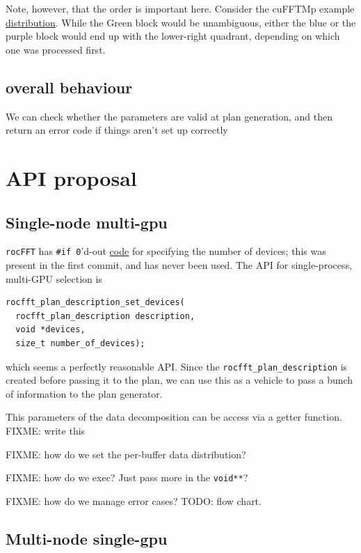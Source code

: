 \documentclass[12pt]{article}
\renewcommand{\(}{\left(}
\renewcommand{\)}{\right)}
\begin{document}
Note, however, that the order is important here.  Consider the cuFFTMp
example
\href{https://docs.nvidia.com/hpc-sdk/cufftmp/usage/api_usage.html#usage-with-custom-slabs-and-pencils-data-decompositions}{distribution}.
While the Green block would be unambiguous, either the blue or the
purple block would end up with the lower-right quadrant, depending on
which one was processed first.

\subsection{overall behaviour}

We can check whether the parameters are valid at plan generation, and
then return an error code if things aren't set up correctly

\section{API proposal}

\subsection{Single-node multi-gpu}

\texttt{rocFFT} has \lstinline{#if 0}'d-out
\href{https://github.com/ROCmSoftwarePlatform/rocFFT/blob/develop/library/include/rocfft.h#L282}{code}
for specifying the number of devices; this was present in the first
commit, and has never been used.  The API for single-process,
multi-GPU selection is
\begin{lstlisting}
rocfft_plan_description_set_devices(
  rocfft_plan_description description,
  void *devices,
  size_t number_of_devices);
\end{lstlisting}
which seems a perfectly reasonable API. Since the
\lstinline{rocfft_plan_description} is created before passing it to
the plan, we can use this as a vehicle to pass a bunch of information
to the plan generator.

This parameters of the data decomposition can be access via a getter
function.  FIXME: write this

FIXME: how do we set the per-buffer data distribution?

FIXME: how do we exec?  Just pass more in the \texttt{void**}?

FIXME: how do we manage error cases?  TODO: flow chart.

\subsection{Multi-node single-gpu}
\end{document}
